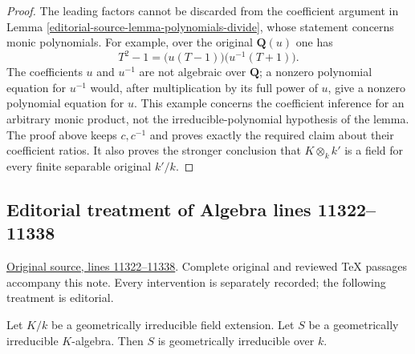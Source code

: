 \begin{proof}
The leading factors cannot be discarded
from the coefficient argument in Lemma
\ref{editorial-source-lemma-polynomials-divide}, whose
statement concerns monic polynomials.
For example, over the original
$\mathbf Q(u)$ one has
$$
T^2-1=\bigl(u(T-1)\bigr)\bigl(u^{-1}(T+1)\bigr).
$$
The coefficients $u$ and $u^{-1}$
are not algebraic over $\mathbf Q$;
a nonzero polynomial equation for
$u^{-1}$ would, after multiplication
by its full power of $u$, give a
nonzero polynomial equation for $u$.
This example concerns the coefficient
inference for an arbitrary monic
product, not the irreducible-polynomial
hypothesis of the lemma. The proof
above keeps $c,c^{-1}$ and proves
exactly the required claim about
their coefficient ratios. It also
proves the stronger conclusion that
$K\otimes_k k'$ is a field for every
finite separable original $k'/k$.
\end{proof}


\subsection{Editorial treatment of Algebra lines 11322--11338}

\hypertarget{algebra-context-143}{}

\noindent\href{https://github.com/stacks/stacks-project/blob/a04446e57ec1fbc252a871afcec7752fb2807b14/algebra.tex\#L11322}{Original source, lines 11322--11338}. Complete original and reviewed TeX passages accompany this note. Every intervention is separately recorded; the following treatment is editorial.


\begin{lemma}
\label{editorial-source-lemma-geometrically-irreducible-transitive}
Let $K/k$ be a geometrically irreducible field extension.
Let $S$ be a geometrically irreducible $K$-algebra.
Then $S$ is geometrically irreducible over $k$.
\end{lemma}

